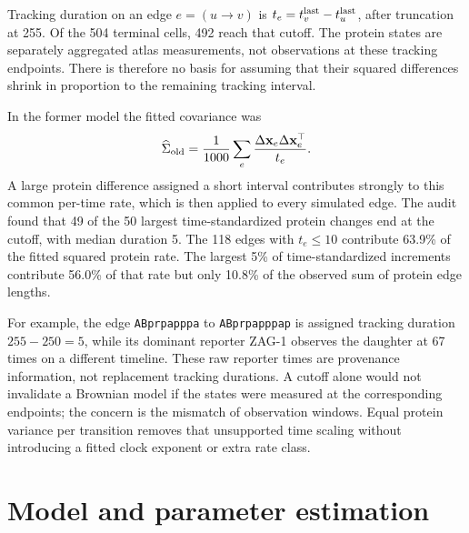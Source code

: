 \documentclass[10pt,letterpaper]{article}
\begin{document}
Tracking duration on an edge $e=(u\to v)$ is
$t_e=t^{\rm last}_v-t^{\rm last}_u$, after truncation at 255. Of the 504
terminal cells, 492 reach that cutoff. The protein states are separately
aggregated atlas measurements, not observations at these tracking endpoints.
There is therefore no basis for assuming that their squared differences
shrink in proportion to the remaining tracking interval.

In the former model the fitted covariance was
\[
 \widehat\Sigma_{\rm old}=\frac1{1000}\sum_e
   \frac{\Delta\mathbf x_e\Delta\mathbf x_e^\top}{t_e}.
\]
A large protein difference assigned a short interval contributes strongly
to this common per-time rate, which is then applied to every simulated edge.
The audit found that 49 of the 50 largest time-standardized protein changes
end at the cutoff, with median duration 5. The 118 edges with $t_e\leq10$
contribute 63.9\% of the fitted squared protein rate. The largest 5\% of
time-standardized increments contribute 56.0\% of that rate but only 10.8\%
of the observed sum of protein edge lengths.

For example, the edge \texttt{ABprpapppa} to \texttt{ABprpapppap} is assigned
tracking duration $255-250=5$, while its dominant reporter ZAG-1 observes
the daughter at 67 times on a different timeline. These raw reporter times
are provenance information, not replacement tracking durations. A cutoff
alone would not invalidate a Brownian model if the states were measured at
the corresponding endpoints; the concern is the mismatch of observation
windows. Equal protein variance per transition removes that unsupported
time scaling without introducing a fitted clock exponent or extra rate class.

\section{Model and parameter estimation}
\end{document}
